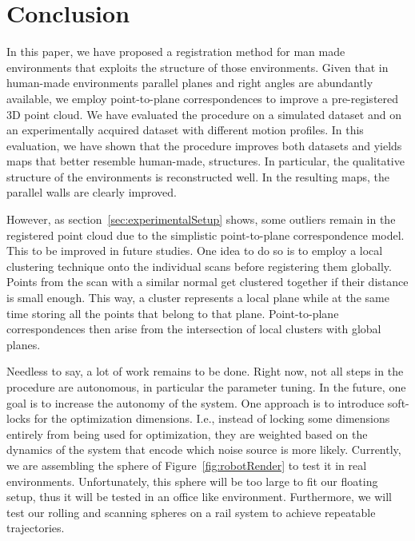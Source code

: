 \section{Conclusion}

In this paper, we have proposed a registration method for man made environments that exploits the structure of those environments. 
Given that in human-made environments parallel planes and right angles are abundantly available, we employ point-to-plane correspondences to improve a pre-registered 3D point cloud. 
We have evaluated the procedure on a simulated dataset and on an experimentally acquired dataset with different motion profiles. 
In this evaluation, we have shown that the procedure improves both datasets and yields maps that better resemble human-made, structures. 
In particular, the qualitative structure of the environments is reconstructed well. 
In the resulting maps, the parallel walls are clearly improved.

However, as section~\ref{sec:experimentalSetup} shows, some outliers remain in the registered point cloud due to the simplistic point-to-plane correspondence model.
This to be improved in future studies.
One idea to do so is to employ a local clustering technique onto the individual scans before registering them globally. 
Points from the scan with a similar normal get clustered together if their distance is small enough.
This way, a cluster represents a local plane while at the same time storing all the points that belong to that plane.
Point-to-plane correspondences then arise from the intersection of local clusters with global planes.

Needless to say, a lot of work remains to be done. 
%
Right now, not all steps in the procedure are autonomous, in particular the parameter tuning. 
In the future, one goal is to increase the autonomy of the system.
One approach is to introduce soft-locks for the optimization dimensions.
I.e., instead of locking some dimensions entirely from being used for optimization, they are weighted based on the dynamics of the system that encode which noise source is more likely.  
%
Currently, we are assembling the sphere of Figure~\ref{fig:robotRender} to test it in real environments.
Unfortunately, this sphere will be too large to fit our floating setup, thus it will be tested in an office like environment.
Furthermore, we will test our rolling and scanning spheres on a rail system to achieve repeatable trajectories. 
